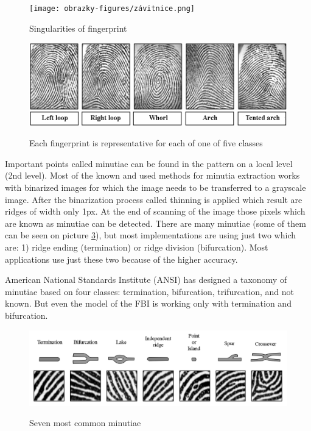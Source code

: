 \begin{figure}[H]
    \centering
        {\texttt{[image: obrazky-figures/závitnice.png]}}\\
        \caption{Singularities of fingerprint\cite{maltoni2009handbook}}
        \label{fig:singularities}
\end{figure}

\begin{figure}[H]
    \centering
        {\includegraphics[width=1\linewidth]{obrazky-figures/classes.png}}\\
        \caption{Each fingerprint is representative for each of one of five classes \cite{maltoni2009handbook}\cite{henry1900classification}}
        \label{fig:classes}
\end{figure}

Important points called minutiae can be found in the pattern on a local level (2nd level). Most of the known and used methods for minutia extraction works with binarized images for which the image needs to be transferred to a grayscale image. After the binarization process called thinning is applied which result are ridges of width only 1px. At the end of scanning of the image those pixels which are known as minutiae can be detected. There are many minutiae (some of them can be seen on picture \ref{fig:minutiae}), but most implementations are using just two which are: 1) ridge ending (termination) or ridge division (bifurcation). Most applications use just these two because of the higher accuracy. \cite{jain2007handbook} \cite{maltoni2009handbook}

American National Standards Institute (ANSI) has designed a taxonomy of minutiae based on four classes: termination, bifurcation, trifurcation, and not known. But even the model of the FBI is working only with termination and bifurcation. \cite{maltoni2009handbook}

\begin{figure}[H]
    \centering
        {\includegraphics[width=\linewidth]{obrazky-figures/minutiae.png}}\\
        \caption{Seven most common minutiae\ \cite{maltoni2009handbook}}
        \label{fig:minutiae}
\end{figure}


